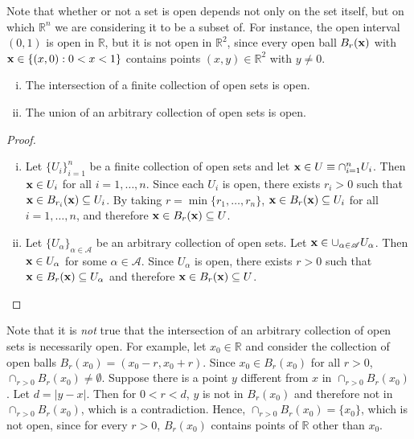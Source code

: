 \documentclass[12pt,letterpaper,reqno]{article}
\numberwithin{equation}{section}
\newcommand{\R}{\ensuremath{\mathbb R}}
\newcommand{\bx}{{\bf x}}
\begin{document}
{Note that whether or not a set is open depends not only on the set itself, but on which $\R^n$ we are considering it to be a subset of. For instance, the open interval $(0,1)$ is open in $\R$, but it is not open in $\R^2$, since every open ball $B_r(\bx)$ with $\bx \in \{(x,0): 0 < x < 1\}$ contains points $(x,y) \in \R^2$ with $y \neq 0$.

\begin{thm}\label{thm:properties_of_open_sets}\hspace{15cm}
\begin{enumerate}[(i)]
	\item The intersection of a finite collection of open sets is open.
	\item The union of an arbitrary collection of open sets is open.
\end{enumerate}
\end{thm}

\begin{proof}
	\begin{enumerate}[(i)]
		\item Let $\{U_i\}_{i=1}^n$ be a finite collection of open sets and let $\bx \in U \equiv \cap_{i=1}^n U_i$. Then $\bx \in U_i$ for all $i=1,\dots,n$. Since each $U_i$ is open, there exists $r_i>0$ such that $\bx \in B_{r_i}(\bx)\subseteq U_i$. By taking $r=\min\{r_1,\dots,r_n\}$, $\bx \in B_r(\bx)\subseteq U_i$ for all $i=1,\dots,n$, and therefore $\bx \in B_r(\bx) \subseteq U$.
		\item Let $\{U_\alpha\}_{\alpha \in \mathscr{A}}$ be an arbitrary collection of open sets. Let $\bx \in \cup_{\alpha \in \mathscr{A}}U_\alpha$. Then $\bx \in U_\alpha$ for some $\alpha \in \mathscr{A}$. Since $U_\alpha$ is open, there exists $r>0$ such that $\bx \in B_r(\bx) \subseteq U_\alpha$ and therefore $\bx \in B_r(\bx) \subseteq U$.
	\end{enumerate}
\end{proof}

Note that it is \emph{not} true that the intersection of an arbitrary collection of open sets is necessarily open. For example, let $x_0 \in \R$ and consider the collection of open balls $B_r(x_0)=(x_0-r,x_0+r)$. Since $x_0 \in B_r(x_0)$ for all $r>0$, $\cap_{r > 0}B_r(x_0) \neq \emptyset$. Suppose there is a point $y$ different from $x$ in $\cap_{r > 0}B_r(x_0)$. Let $d=|y-x|$. Then for $0<r<d$, $y$ is not in $B_r(x_0)$ and therefore not in $\cap_{r > 0}B_r(x_0)$, which is a contradiction. Hence, $\cap_{r > 0}B_r(x_0)=\{x_0\}$, which is not open, since for every $r>0$, $B_r(x_0)$ contains points of $\R$ other than $x_0$.

}
\end{document}
